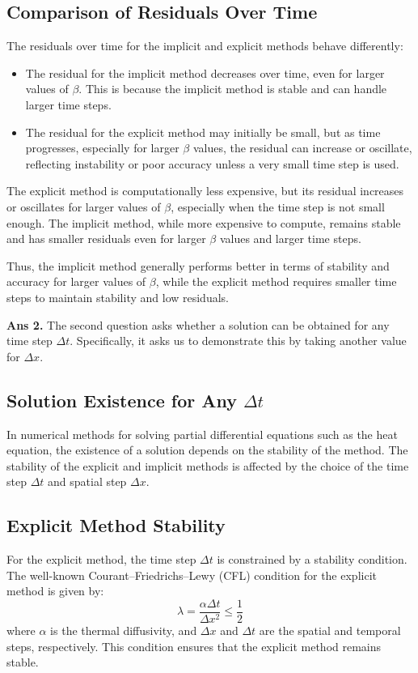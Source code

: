 \documentclass[12pt]{article}
\begin{document}
\subsection*{Comparison of Residuals Over Time}
The residuals over time for the implicit and explicit methods behave differently:
\begin{itemize}
    \item The residual for the implicit method decreases over time, even for larger values of \( \beta \). This is because the implicit method is stable and can handle larger time steps.
    \item The residual for the explicit method may initially be small, but as time progresses, especially for larger \( \beta \) values, the residual can increase or oscillate, reflecting instability or poor accuracy unless a very small time step is used.
\end{itemize}

The explicit method is computationally less expensive, but its residual increases or oscillates for larger values of \( \beta \), especially when the time step is not small enough. The implicit method, while more expensive to compute, remains stable and has smaller residuals even for larger \( \beta \) values and larger time steps.

Thus, the implicit method generally performs better in terms of stability and accuracy for larger values of \( \beta \), while the explicit method requires smaller time steps to maintain stability and low residuals.

\textbf{Ans 2.} The second question asks whether a solution can be obtained for any time step \( \Delta t \). Specifically, it asks us to demonstrate this by taking another value for \( \Delta x \).

\subsection*{Solution Existence for Any \( \Delta t \)}
In numerical methods for solving partial differential equations such as the heat equation, the existence of a solution depends on the stability of the method. The stability of the explicit and implicit methods is affected by the choice of the time step \( \Delta t \) and spatial step \( \Delta x \).

\subsection*{Explicit Method Stability}
For the explicit method, the time step \( \Delta t \) is constrained by a stability condition. The well-known Courant–Friedrichs–Lewy (CFL) condition for the explicit method is given by:
\[
\lambda = \frac{\alpha \Delta t}{\Delta x^2} \leq \frac{1}{2}
\]
where \( \alpha \) is the thermal diffusivity, and \( \Delta x \) and \( \Delta t \) are the spatial and temporal steps, respectively. This condition ensures that the explicit method remains stable.
\end{document}
